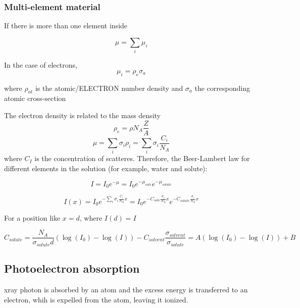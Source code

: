 \subsubsection{Multi-element material}
If there is more than one element inside

\begin{equation}
        \mu = \sum_i \mu_i
\end{equation}

In the case of electrons, 
\begin{equation}
        \mu_i = \rho_{e} \sigma_a
\end{equation}

where $\rho_{at}$ is the atomic/ELECTRON number density and $\sigma_a$ the corresponding atomic cross-section

The electron density is related to the mass density
\begin{equation}
        \rho_e = \rho N_A \frac{Z}{A}
\end{equation}
\begin{equation}
        \mu = \sum_i \sigma_i \rho_i =\sum_i \sigma_i \frac{C_i}{N_A}
\end{equation}
where $C_I$ is the concentration of scatteres. Therefore, the Beer-Lambert law for different elements in the solution (for example, water and solute):

\begin{equation}
        I = I_0 e^{-\mu} = I_0e^{-\mu_{solv}}e^{-\mu_{solute}}
\end{equation}

\begin{equation}
        I(x) = I_0 e^{-\sum_i \sigma_i \frac{C_i}{N_A} x} =  I_0e^{-C_{solv} \frac{\sigma_i}{N_A}x}e^{-C_{solute} \frac{\sigma_i}{N_A}x}
\end{equation}

For a position like $x=d$, where $I(d)=I$

\begin{equation}
        C_{solute}=\frac{N_A}{\sigma_{solute}d}\left( \log(I_0) - \log(I) \right) - C_{solvent} \frac{\sigma_{solvent}}{\sigma_{solute}}=A \left( \log(I_0) - \log(I) \right) + B
\end{equation}

\subsection{Photoelectron absorption}

xray photon is absorbed by an atom and the excess energy is transferred to an electron, whih is expelled from the atom, leaving it ionized.

